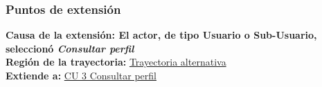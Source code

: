 \subsubsection{Puntos de extensión}
\noindent \textbf{Causa de la extensión: El actor, de tipo Usuario o Sub-Usuario, seleccionó \textit{Consultar perfil}} \\
\textbf{Región de la trayectoria:} \hyperref[cu_ta_]{Trayectoria alternativa } \\
\textbf{Extiende a:} \hyperref[cu3]{CU 3 Consultar perfil}
